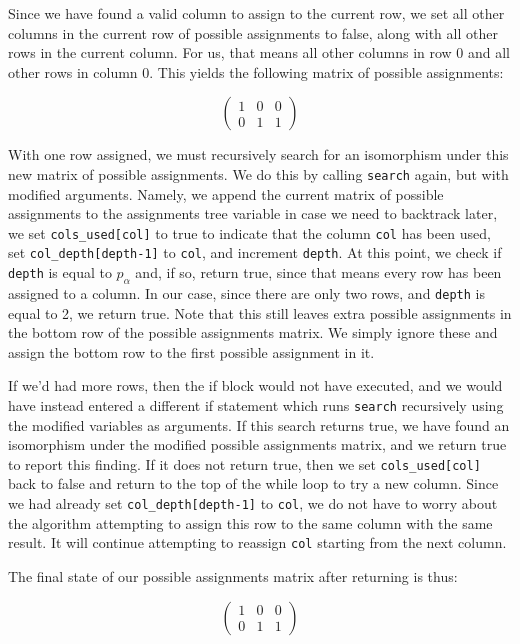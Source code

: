 \documentclass{article}
\begin{document}
  Since we have found a valid column to assign to the current row, we set all other columns in the current row of possible assignments to false, along with all other rows in the current column. For us, that means all other columns in row 0 and all other rows in column 0. This yields the following matrix of possible assignments:

  \[ \begin{pmatrix}
      1 & 0 & 0 \\
      0 & 1 & 1
  \end{pmatrix} \]

  With one row assigned, we must recursively search for an isomorphism under this new matrix of possible assignments. We do this by calling \texttt{search} again, but with modified arguments. Namely, we append the current matrix of possible assignments to the assignments tree variable in case we need to backtrack later, we set \texttt{cols\_used[col]} to true to indicate that the column \texttt{col} has been used, set \texttt{col\_depth[depth-1]} to \texttt{col}, and increment \texttt{depth}. At this point, we check if \texttt{depth} is equal to $p_{\alpha}$ and, if so, return true, since that means every row has been assigned to a column. In our case, since there are only two rows, and \texttt{depth} is equal to 2, we return true. Note that this still leaves extra possible assignments in the bottom row of the possible assignments matrix. We simply ignore these and assign the bottom row to the first possible assignment in it. 
  
  If we'd had more rows, then the if block would not have executed, and we would have instead entered a different if statement which runs \texttt{search} recursively using the modified variables as arguments. If this search returns true, we have found an isomorphism under the modified possible assignments matrix, and we return true to report this finding. If it does not return true, then we set \texttt{cols\_used[col]} back to false and return to the top of the while loop to try a new column. Since we had already set \texttt{col\_depth[depth-1]} to \texttt{col}, we do not have to worry about the algorithm attempting to assign this row to the same column with the same result. It will continue attempting to reassign \texttt{col} starting from the next column.

  The final state of our possible assignments matrix after returning is thus:

  \[ \begin{pmatrix}
      1 & 0 & 0 \\
      0 & 1 & 1
  \end{pmatrix} \]
\end{document}
